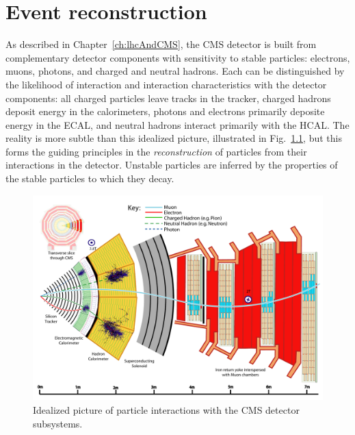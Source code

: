 \chapter{Event reconstruction}
\label{ch:reconstruction}

As described in Chapter~\ref{ch:lhcAndCMS}, the CMS detector
is built from complementary detector components with sensitivity
to stable particles: electrons, muons, photons, and charged
and neutral hadrons. Each can be distinguished by the likelihood of interaction
and interaction characteristics with the detector components:
all charged particles leave tracks in the tracker,
charged hadrons deposit energy in the calorimeters, photons
and electrons primarily deposite energy in the ECAL, and neutral
hadrons interact primarily with the HCAL.
The reality is more subtle than this idealized picture, illustrated
in Fig.~\ref{fig:particleFlow}, but this forms the guiding principles
in the \emph{reconstruction} of particles from their interactions in the detector.
Unstable particles are inferred by the properties of the stable particles to 
which they decay.

\begin{figure}[htbp]
  \centering
   \includegraphics[width=\textwidth]{figures/Reconstruction/CMSDetectorParticleFlow.pdf}
  \caption{
    Idealized picture of particle interactions with the CMS detector subsystems.
        }
 \label{fig:particleFlow}
\end{figure}


